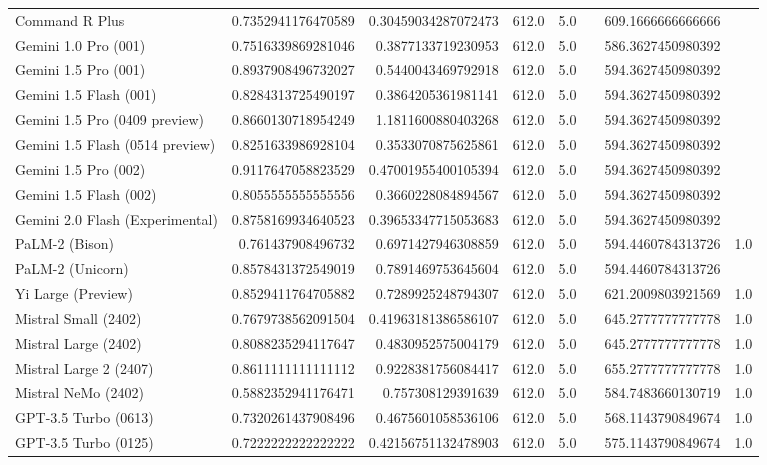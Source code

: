 \begin{table}[htp]
{\begin{tabular}{lrrrrrrr}
Command R Plus & 0.7352941176470589 & 0.30459034287072473 & 612.0 & 5.0 &  & 609.1666666666666 &  \\
Gemini 1.0 Pro (001) & 0.7516339869281046 & 0.3877133719230953 & 612.0 & 5.0 &  & 586.3627450980392 &  \\
Gemini 1.5 Pro (001) & 0.8937908496732027 & 0.5440043469792918 & 612.0 & 5.0 &  & 594.3627450980392 &  \\
Gemini 1.5 Flash (001) & 0.8284313725490197 & 0.3864205361981141 & 612.0 & 5.0 &  & 594.3627450980392 &  \\
Gemini 1.5 Pro (0409 preview) & 0.8660130718954249 & 1.1811600880403268 & 612.0 & 5.0 &  & 594.3627450980392 &  \\
Gemini 1.5 Flash (0514 preview) & 0.8251633986928104 & 0.3533070875625861 & 612.0 & 5.0 &  & 594.3627450980392 &  \\
Gemini 1.5 Pro (002) & 0.9117647058823529 & 0.47001955400105394 & 612.0 & 5.0 &  & 594.3627450980392 &  \\
Gemini 1.5 Flash (002) & 0.8055555555555556 & 0.3660228084894567 & 612.0 & 5.0 &  & 594.3627450980392 &  \\
Gemini 2.0 Flash (Experimental) & 0.8758169934640523 & 0.39653347715053683 & 612.0 & 5.0 &  & 594.3627450980392 &  \\
PaLM-2 (Bison) & 0.761437908496732 & 0.6971427946308859 & 612.0 & 5.0 &  & 594.4460784313726 & 1.0 \\
PaLM-2 (Unicorn) & 0.8578431372549019 & 0.7891469753645604 & 612.0 & 5.0 &  & 594.4460784313726 &  \\
Yi Large (Preview) & 0.8529411764705882 & 0.7289925248794307 & 612.0 & 5.0 &  & 621.2009803921569 & 1.0 \\
Mistral Small (2402) & 0.7679738562091504 & 0.41963181386586107 & 612.0 & 5.0 &  & 645.2777777777778 & 1.0 \\
Mistral Large (2402) & 0.8088235294117647 & 0.4830952575004179 & 612.0 & 5.0 &  & 645.2777777777778 & 1.0 \\
Mistral Large 2 (2407) & 0.8611111111111112 & 0.9228381756084417 & 612.0 & 5.0 &  & 655.2777777777778 & 1.0 \\
Mistral NeMo (2402) & 0.5882352941176471 & 0.757308129391639 & 612.0 & 5.0 &  & 584.7483660130719 & 1.0 \\
GPT-3.5 Turbo (0613) & 0.7320261437908496 & 0.4675601058536106 & 612.0 & 5.0 &  & 568.1143790849674 & 1.0 \\
GPT-3.5 Turbo (0125) & 0.7222222222222222 & 0.42156751132478903 & 612.0 & 5.0 &  & 575.1143790849674 & 1.0 \\

\end{tabular}}
\end{table}
